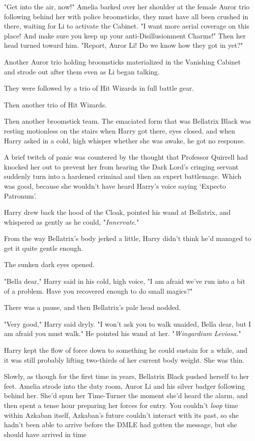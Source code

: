"Get into the air, now!" Amelia barked over her shoulder at the female Auror
trio following behind her with police broomsticks, they must have all been
crushed in there, waiting for Li to activate the Cabinet. "I want more aerial
coverage on this place! And make sure you keep up your anti-Disillusionment
Charms!" Then her head turned toward him. "Report, Auror Li! Do we know how
they got in yet?"

Another Auror trio holding broomsticks materialized in the Vanishing Cabinet
and strode out after them even as Li began talking.

They were followed by a trio of Hit Wizards in full battle gear.

Then another trio of Hit Wizards.

Then another broomstick team.
\sbreak
The emaciated form that was Bellatrix Black was resting motionless on the
stairs when Harry got there, eyes closed, and when Harry asked in a cold, high
whisper whether she was awake, he got no response.

A brief twitch of panic was countered by the thought that Professor Quirrell
had knocked her out to prevent her from hearing the Dark Lord's cringing
servant suddenly turn into a hardened criminal and then an expert battlemage.
Which was good, because she wouldn't have heard Harry's voice saying `Expecto
Patronum'.

Harry drew back the hood of the Cloak, pointed his wand at Bellatrix, and
whispered as gently as he could, "\emph{Innervate.}"

From the way Bellatrix's body jerked a little, Harry didn't think he'd managed
to get it quite gentle enough.

The sunken dark eyes opened.

"Bella dear," Harry said in his cold, high voice, "I am afraid we've run into a
bit of a problem. Have you recovered enough to do small magics?"

There was a pause, and then Bellatrix's pale head nodded.

"Very good," Harry said dryly. "I won't ask you to walk unaided, Bella dear,
but I am afraid you must walk." He pointed his wand at her. "\emph{Wingardium
Leviosa.}"

Harry kept the flow of force down to something he could sustain for a while,
and it was still probably lifting two-thirds of her current body weight. She
was{\el} thin.

Slowly, as though for the first time in years, Bellatrix Black pushed herself
to her feet.
\sbreak
Amelia strode into the duty room, Auror Li and his silver badger following
behind her. She'd spun her Time-Turner the moment she'd heard the alarm, and
then spent a tense hour preparing her forces for entry. You couldn't
\emph{loop} time within Azkaban itself, Azkaban's future couldn't interact with
its past, so she hadn't been able to arrive before the DMLE had gotten the
message, but she should have arrived in time{\el}

